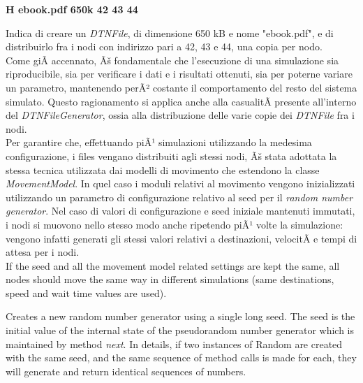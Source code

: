\begin{center}
\textbf{H	ebook.pdf	650k	42	43	44}
\end{center}
Indica di creare un \textit{DTNFile}, di dimensione 650 kB e nome "ebook.pdf", e di distribuirlo fra i nodi con indirizzo pari a 42, 43 e 44, una copia per nodo.
\\

Come giÃ  accennato, Ãš fondamentale che l'esecuzione di una simulazione sia riproducibile, sia per verificare i dati e i risultati ottenuti, sia per poterne variare un parametro, mantenendo perÃ² costante il comportamento del resto del sistema simulato. Questo ragionamento si applica anche alla casualitÃ  presente all'interno del \textit{DTNFileGenerator}, ossia alla distribuzione delle varie copie dei \textit{DTNFile} fra i nodi.
\\
Per garantire che, effettuando piÃ¹ simulazioni utilizzando la medesima configurazione, i files vengano distribuiti agli stessi nodi, Ãš stata adottata la stessa tecnica utilizzata dai modelli di movimento che estendono la classe \textit{MovementModel}. In quel caso i moduli relativi al movimento vengono inizializzati utilizzando un parametro di configurazione relativo al seed per il \textit{random number generator}. Nel caso di valori di configurazione e seed iniziale mantenuti immutati, i nodi si muovono nello stesso modo anche ripetendo piÃ¹ volte la simulazione: vengono infatti generati gli stessi valori relativi a destinazioni, velocitÃ  e tempi di attesa per i nodi.
\\
If the seed and all the movement model related settings are kept the same, all nodes should 
move the same way in different simulations (same destinations, speed and wait time values are used).

Creates a new random number generator using a single long seed. The seed is the initial value of the internal state of the pseudorandom number generator which is maintained by method \textit{next}. In details, if two instances of Random are created with the same seed, and the same sequence of method calls is made for each, they will generate and return identical sequences of numbers.



